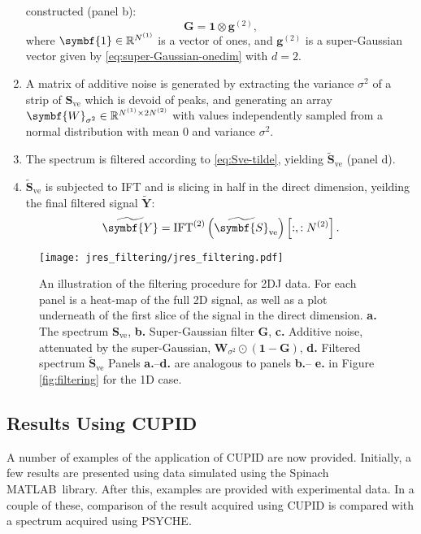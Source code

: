 \begin{enumerate}
        constructed (panel b):
        \begin{equation}
            \symbf{G} = \symbf{1} \otimes \symbf{g}^{(2)},
        \end{equation}
        where $\symbf{1} \in \mathbb{R}^{\None}$ is a vector of ones, and
        $\symbf{g}^{(2)}$ is a super-Gaussian vector given by
        \eqref{eq:super-Gaussian-onedim} with $d=2$.
    \item A matrix of additive noise is generated by extracting the variance
        $\sigma^2$ of a strip of $\symbf{S}_{\text{ve}}$ which is devoid of
        peaks, and generating an array $\symbf{W}_{\sigma^2} \in
        \mathbb{R}^{\None \times 2 \Ntwo}$ with values independently sampled
        from a normal distribution with mean $0$ and variance  $\sigma^2$.
    \item The spectrum is filtered according to \eqref{eq:Sve-tilde}, yielding
        $\widetilde{\symbf{S}}_{\text{ve}}$ (panel d).
    \item $\widetilde{\symbf{S}}_{\text{ve}}$ is subjected to \ac{IFT} and is
        slicing in half in the direct dimension, yeilding the final filtered
        signal $\widetilde{\symbf{Y}}$:
        \begin{equation}
            \widetilde{\symbf{Y}} = \IFT^{(2)}\left(\widetilde{\symbf{S}}_{\text{ve}}\right) \left[:, : \Ntwo\right].
        \end{equation}
\end{enumerate}

\begin{figure}
    \centering
    \texttt{[image: jres\_filtering/jres\_filtering.pdf]}
    \caption{
        An illustration of the filtering procedure for \ac{2DJ} data.
        For each panel is a heat-map of the full \ac{2D} signal, as well as a
        plot underneath of the first slice of the signal in the direct
        dimension.
        \textbf{a.} The spectrum $\symbf{S}_{\text{ve}}$,
        \textbf{b.} Super-Gaussian filter $\symbf{G}$,
        \textbf{c.} Additive noise, attenuated by the super-Gaussian, $\symbf{W}_{\sigma^2} \odot (\symbf{1} - \symbf{G})$,
        \textbf{d.} Filtered spectrum $\widetilde{\symbf{S}}_{\text{ve}}$
        Panels \textbf{a.}--\textbf{d.} are analogous to panels \textbf{b.}--
        \textbf{e.} in Figure \ref{fig:filtering} for the \ac{1D} case.
    }
    \label{fig:jres-filtering}
\end{figure}

\subsection{Results Using \acs{CUPID}}
A number of examples of the application of \ac{CUPID} are now provided.
Initially, a few results are presented using data simulated using the Spinach
MATLAB\textregistered\ library\cite{Hogben2011}. After this, examples are
provided with experimental data. In a couple of these, comparison of the result
acquired using \ac{CUPID} is compared with a spectrum acquired using
\ac{PSYCHE}.


